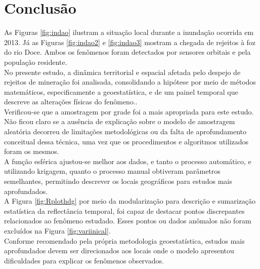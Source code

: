 \section{Conclusão}

\hspace*{1.25 cm}  As Figuras \ref{fig:indao} ilustram a situação local durante a inundação ocorrida em 2013. Já as Figuras \ref{fig:indao2} e \ref{fig:indao3} mostram a chegada de rejeitos à foz do rio Doce. Ambos os fenômenos foram detectados por sensores orbitais e pela população residente.\\
%
\hspace*{1.25 cm} No presente estudo, a dinâmica territorial e espacial afetada pelo despejo de rejeitos de mineração foi analisada, consolidando a hipótese por meio de métodos matemáticos, especificamente a geoestatística, e de um painel temporal que descreve as alterações físicas do fenômeno..\\
% 
\hspace*{1.25 cm} Verificou-se que a amostragem por grade foi a mais apropriada para este estudo. Não ficou claro se a ausência de explicação sobre o modelo de amostragem aleatória decorreu de limitações metodológicas ou da falta de aprofundamento conceitual dessa técnica, uma vez que os procedimentos e algoritmos utilizados foram os mesmos.\\
%
\hspace*{1.25 cm}A função esférica ajustou-se melhor aos dados, e tanto o processo automático, e utilizando krigagem, quanto o processo manual obtiveram parâmetros semelhantes, permitindo descrever os locais geográficos para estudos mais aprofundados. \\
%
\hspace*{1.25 cm} A  Figura \ref{fig:Rplothdg} por meio da modularização para descrição e sumarização estatística da reflectância temporal, foi capaz de destacar pontos discrepantes relacionados ao fenômeno estudado. Esses pontos ou dados anômalos não foram excluídos na Figura \ref{fig:variinical}.\\
%
\hspace*{1.25 cm} Conforme recomendado pela própria metodologia geoestatística, estudos mais aprofundados devem ser direcionados aos locais onde o modelo apresentou dificuldades para explicar os fenômenos observados.
